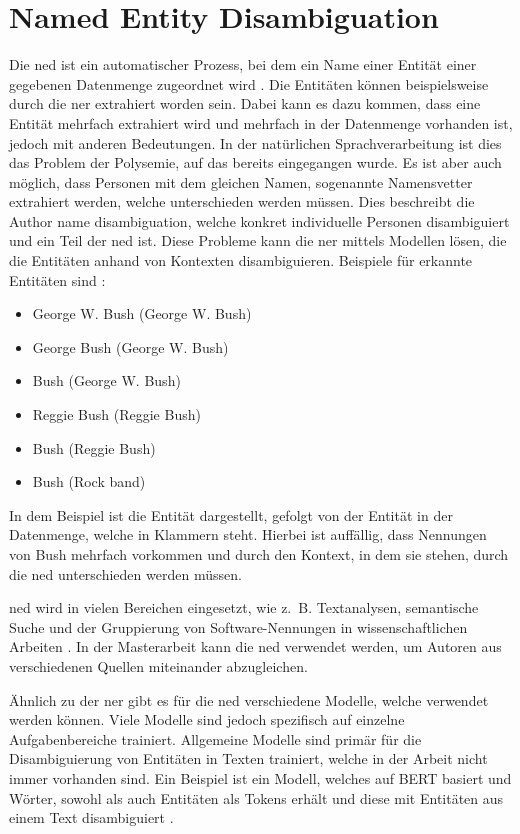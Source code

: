 \section{Named Entity Disambiguation}
\label{sec:author-name-disambiguation}
Die \gls{ned} ist ein automatischer Prozess, bei dem ein Name einer Entität einer gegebenen Datenmenge zugeordnet wird \autocites{cucerzan_large-scale_2007}{yamada_global_2022}.
Die Entitäten können beispielsweise durch die \gls{ner} extrahiert worden sein.
Dabei kann es dazu kommen, dass eine Entität mehrfach extrahiert wird und mehrfach in der Datenmenge vorhanden ist, jedoch mit anderen Bedeutungen.
In der natürlichen Sprachverarbeitung ist dies das Problem der Polysemie, auf das bereits eingegangen wurde.
Es ist aber auch möglich, dass Personen mit dem gleichen Namen, sogenannte Namensvetter extrahiert werden, welche unterschieden werden müssen.
Dies beschreibt die Author name disambiguation, welche konkret individuelle Personen disambiguiert und ein Teil der \gls{ned} ist.
Diese Probleme kann die \gls{ner} mittels Modellen lösen, die die Entitäten anhand von Kontexten disambiguieren.
Beispiele für erkannte Entitäten sind \autocite{cucerzan_large-scale_2007}:

\begin{itemize}
  \item George W. Bush (George W. Bush)
  \item George Bush (George W. Bush)
  \item Bush (George W. Bush)
  \item Reggie Bush (Reggie Bush)
  \item Bush (Reggie Bush)
  \item Bush (Rock band)
\end{itemize}

In dem Beispiel ist die Entität dargestellt, gefolgt von der Entität in der Datenmenge, welche in Klammern steht.
Hierbei ist auffällig, dass Nennungen von \glqq Bush\grqq{} mehrfach vorkommen und durch den Kontext, in dem sie stehen, durch die \gls{ned} unterschieden werden müssen.

\gls{ned} wird in vielen Bereichen eingesetzt, wie z. B. Textanalysen, semantische Suche und der Gruppierung von Software-Nennungen in wissenschaftlichen Arbeiten \autocites{cucerzan_large-scale_2007}{yamada_global_2022}{schindler_somesci-_2021}.
In der Masterarbeit kann die \gls{ned} verwendet werden, um Autoren aus verschiedenen Quellen miteinander abzugleichen.

Ähnlich zu der \gls{ner} gibt es für die \gls{ned} verschiedene Modelle, welche verwendet werden können.
Viele Modelle sind jedoch spezifisch auf einzelne Aufgabenbereiche trainiert.
Allgemeine Modelle sind primär für die Disambiguierung von Entitäten in Texten trainiert, welche in der Arbeit nicht immer vorhanden sind.
Ein Beispiel ist ein Modell, welches auf BERT basiert und Wörter, sowohl als auch Entitäten als Tokens erhält und diese mit Entitäten aus einem Text disambiguiert \autocite{yamada_global_2022}.
